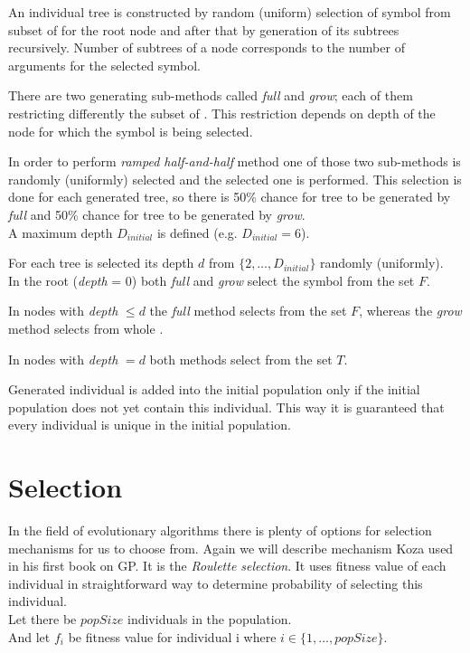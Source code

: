 \documentclass[12pt,a4paper]{report}
\newcommand{\setDots}[2]{ 
	\lbrace #1 , \dots , #2 \rbrace
}
\begin{document}
An individual tree is constructed by random (uniform) selection of symbol from 
subset of \TuF for the root node and after that by generation of its 
subtrees recursively. 
Number of subtrees of a node corresponds 
to the number of arguments for the selected symbol. 

There are two generating sub-methods called \textit{full} and 
\textit{grow}; each of them restricting differently the subset of \TuF. 
This restriction depends on depth of the
node for which the symbol is being selected. 

In order to perform \textit{ramped half-and-half} method
one of those two sub-methods is randomly (uniformly) 
selected and the selected one is performed.
This selection is done for each generated tree, so there
is 50\% chance for tree to be generated by \textit{full} 
and 50\% chance for tree to be generated by \textit{grow}.\\


A maximum depth $D_{initial}$ is defined (e.g. $D_{initial} = 6$).

For each tree is selected its 
depth $d$ from $\setDots{2}{D_{initial}}$ randomly (uniformly).\\


In the root (\textit{depth} = 0) both \textit{full} and \textit{grow}
select the symbol from the set $F$.

In nodes with \textit{depth} $\leq d$ the \textit{full}
method selects from the set $F$, whereas the \textit{grow} method 
selects from whole \TuF.

In nodes with \textit{depth} $= d$ both methods select from the
set $T$.

Generated individual is added into the initial population only if 
the initial population does not yet contain this individual.
This way it is guaranteed that every individual is unique 
in the initial population.
  
 



\section{Selection}

In the field of evolutionary algorithms there is plenty of 
options for selection mechanisms 
for us to choose from. Again we will describe mechanism Koza
used in his first book on GP. It is the \textit{Roulette selection}.
It uses fitness value of each individual in straightforward way to determine probability of selecting this individual.\\
\newpage
Let there be $popSize$ individuals in the population.\\
And let $f_{i}$ be fitness value for individual i 
where $i \in \setDots{1}{popSize}$. 
\end{document}
